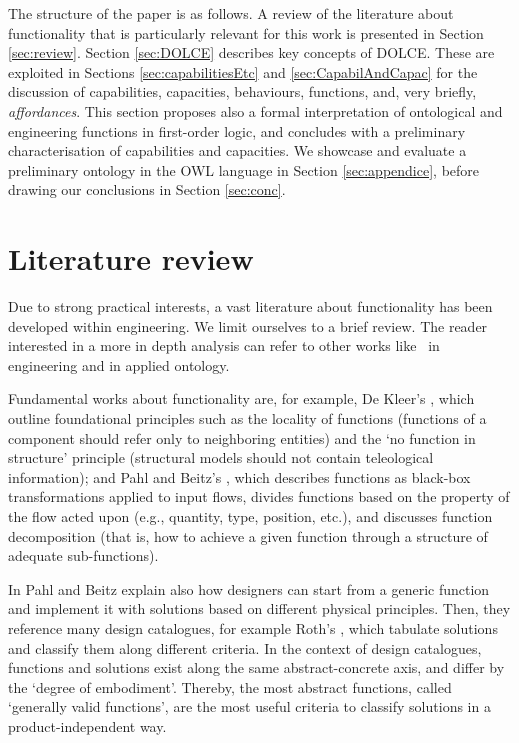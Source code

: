 \documentclass[sw]{iosart2x}
\newcommand{\DOLCE}{\textsc{DOLCE}\xspace} %
\newcommand{\OWL}{\textnormal{OWL}\xspace}
\newcommand{\firstTimeKeyWord}[1]{\textit{#1}}
\newcommand{\quotes}[1]{`#1'}
\begin{document}
The structure of the paper is as follows. A review of the literature about functionality that is particularly relevant for this work is presented in Section \ref{sec:review}. 
Section \ref{sec:DOLCE} describes key concepts of \DOLCE. These are exploited in Sections \ref{sec:capabilitiesEtc} and \ref{sec:CapabilAndCapac} for the discussion of capabilities, capacities, behaviours, functions, and, very briefly, \firstTimeKeyWord{affordances}. This section proposes also a formal interpretation of ontological and engineering functions in first-order logic, and concludes with a preliminary characterisation of capabilities and capacities. We showcase and evaluate a preliminary ontology in the \OWL language in Section \ref{sec:appendice}, before drawing our conclusions in Section \ref{sec:conc}. 

\section{Literature review\label{sec:review}} %
Due to strong practical interests, a vast literature about functionality has been developed within engineering. 
We limit ourselves to a brief review. The reader interested in a more in depth analysis can refer to other works like~\cite{erdenReviewFunctionModeling2008} in engineering and \cite{artigaNewPerspectiveOnFunctions} in applied ontology.

Fundamental works about functionality are, for example, De Kleer's \cite{de_kleer_how_1984, kleer_qualitative_1984}, which outline foundational principles such as the locality of functions (functions of a component should refer only to neighboring entities) and the \quotes{no function in structure} principle (structural models should not contain teleological information); and Pahl and Beitz's \cite{pahl_engineering_2007}, which describes functions as black-box transformations applied to input flows, divides functions based on the property of the flow acted upon (e.g., quantity, type, position, etc.), and discusses function decomposition (that is, how to achieve a given function through a structure of adequate sub-functions).

In \cite{pahl_engineering_2007} Pahl and Beitz explain also how designers can start from a generic function and implement it with solutions based on different physical principles. 
Then, they reference many design catalogues, for example Roth's \cite{rothKonstruierenMitKonstruktionskatalogen2000}, which tabulate solutions and classify them along different criteria.
In the context of design catalogues, functions and solutions exist along the same abstract-concrete axis, and differ by the \quotes{degree of embodiment}. 
Thereby, the most abstract functions, called \quotes{generally valid functions}, are the most useful criteria to classify solutions in a product-independent way. 
\end{document}
